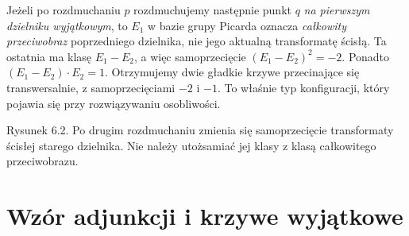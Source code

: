 \begin{uwaga}
\label{uw:ga6-infinitely-near}
Jeżeli po rozdmuchaniu $p$ rozdmuchujemy następnie punkt
$q$ \emph{na pierwszym dzielniku wyjątkowym}, to
$E_1$ w bazie grupy Picarda oznacza \emph{całkowity
przeciwobraz} poprzedniego dzielnika, nie jego aktualną
transformatę ścisłą. Ta ostatnia ma klasę $E_1-E_2$,
a więc samoprzecięcie $(E_1-E_2)^2=-2$.
Ponadto $(E_1-E_2)\cdot E_2=1$. Otrzymujemy dwie
gładkie krzywe przecinające się transwersalnie,
z samoprzecięciami $-2$ i $-1$. To właśnie typ
konfiguracji, który pojawia się przy rozwiązywaniu
osobliwości.
\end{uwaga}

\begin{center}
\begin{minipage}{\linewidth}
\centering
{}

{\small Rysunek 6.2. Po drugim rozdmuchaniu zmienia się samoprzecięcie transformaty ścisłej starego dzielnika. Nie należy utożsamiać jej klasy z klasą całkowitego przeciwobrazu.}\par
\end{minipage}
\end{center}

\section{Wzór adjunkcji i krzywe wyjątkowe}
\label{sec:ga6-adjunction}

